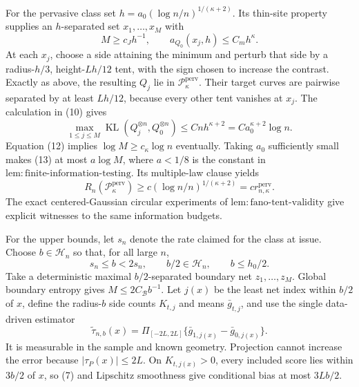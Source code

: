 For the pervasive class set \(h=a_0(\log n/n)^{1/(\kappa+2)}\).  Its thin-site property supplies an \(h\)-separated set \(x_1,\ldots,x_M\) with
\[
 M\ge c_Jh^{-1},\qquad a_{Q_0}(x_j,h)\le C_mh^\kappa. \tag{12}
\]
At each \(x_j\), choose a side attaining the minimum and perturb that side by a radius-\(h/3\), height-\(Lh/12\) tent, with the sign chosen to increase the contrast.  Exactly as above, the resulting \(Q_j\) lie in \(\mathcal P_\kappa^{\mathrm{perv}}\).  Their target curves are pairwise separated by at least \(Lh/12\), because every other tent vanishes at \(x_j\).  The calculation in (10) gives
\[
 \max_{1\le j\le M}\operatorname{KL}(Q_j^{\otimes n},Q_0^{\otimes n})
 \le Cnh^{\kappa+2}=Ca_0^{\kappa+2}\log n. \tag{13}
\]
Equation (12) implies \(\log M\ge c_\kappa\log n\) eventually.  Taking \(a_0\) sufficiently small makes (13) at most \(a\log M\), where \(a<1/8\) is the constant in \(\mathrm{lem:finite\text{-}information\text{-}testing}\).  Its multiple-law clause yields
\[
 R_n(\mathcal P_\kappa^{\mathrm{perv}})\ge c(\log n/n)^{1/(\kappa+2)}=c r_{n,\kappa}^{\mathrm{perv}}. \tag{14}
\]
The exact centered-Gaussian circular experiments of \(\mathrm{lem:fano\text{-}tent\text{-}validity}\) give explicit witnesses to the same information budgets.

For the upper bounds, let \(s_n\) denote the rate claimed for the class at issue.  Choose \(b\in\mathcal H_n\) so that, for all large \(n\),
\[
 s_n\le b<2s_n,\qquad b/2\in\mathcal H_n,\qquad b\le h_0/2. \tag{15}
\]
Take a deterministic maximal \(b/2\)-separated boundary net \(z_1,\ldots,z_M\).  Global boundary entropy gives \(M\le2C_{\mathcal B}b^{-1}\).  Let \(j(x)\) be the least net index within \(b/2\) of \(x\), define the radius-\(b\) side counts \(K_{t,j}\) and means \(\bar g_{t,j}\), and use the single data-driven estimator
\[
 \widetilde\tau_{n,b}(x)=\Pi_{[-2L,2L]}\{\bar g_{1,j(x)}-\bar g_{0,j(x)}\}. \tag{16}
\]
It is measurable in the sample and known geometry.  Projection cannot increase the error because \(|\tau_P(x)|\le2L\).  On \(K_{t,j(x)}>0\), every included score lies within \(3b/2\) of \(x\), so (7) and Lipschitz smoothness give conditional bias at most \(3Lb/2\).

